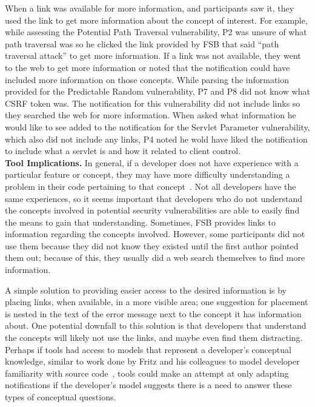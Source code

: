 \documentclass[conference]{IEEEtran}
\begin{document}

When a link was available for more information, and participants saw it, they used the link to get more information about the concept of interest.
For example, while assessing the Potential Path Traversal vulnerability, P2 was unsure of what path traversal was so he clicked the link provided by FSB that said ``path traversal attack'' to get more information.
If a link was not available, they went to the web to get more information or noted that the notification could have included more information on those concepts.
While parsing the information provided for the Predictable Random vulnerability, P7 and P8 did not know what CSRF token was.
The notification for this vulnerability did not include links so they searched the web for more information. 
When asked what information he would like to see added to the notification for the Servlet Parameter vulnerability, which also did not include any links, P4 noted he wold have liked the notification to include what a servlet is and how it related to client control.
\\

\noindent\textbf{Tool Implications.}
In general, if a developer does not have experience with a particular feature or concept, they may have more difficulty understanding a problem in their code pertaining to that concept~\cite{wiedenbeck1993mental}.
Not all developers have the same experiences, so it seems important that developers who do not understand the concepts involved in potential security vulnerabilities are able to easily find the means to gain that understanding.
Sometimes, FSB provides links to information regarding the concepts involved. 
However, some participants did not use them because they did not know they existed until the first author pointed them out; because of this, they usually did a web search themselves to find more information.

A simple solution to providing easier access to the desired information is by placing links, when available, in a  more visible area; one suggestion for placement is nested in the text of the error message next to the concept it has information about. 
One potential downfall to this solution is that developers that understand the concepts will likely not use the links, and maybe even find them distracting.   
Perhaps if tools had access to models that represent a developer's conceptual knowledge, similar to work done by Fritz and his colleagues to model developer familiarity with source code~\cite{fritz2010degree}, tools could make an attempt at only adapting notifications if the developer's model suggests there is a need to answer these types of conceptual questions.
\end{document}
